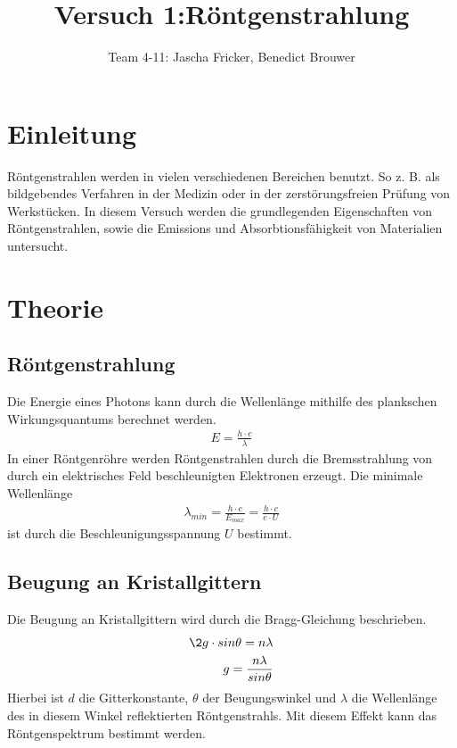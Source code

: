 \documentclass[11pt, a4paper]{article}
\title{Versuch 1:Röntgenstrahlung}
\author{Team 4-11: Jascha Fricker, Benedict Brouwer}
\begin{document}
    \maketitle

    \tableofcontents

    \newpage

    \section{Einleitung}

    Röntgenstrahlen werden in vielen verschiedenen Bereichen benutzt. So z. B. als bildgebendes Verfahren in der Medizin oder in der zerstörungsfreien Prüfung von Werkstücken. In diesem Versuch werden die grundlegenden Eigenschaften von Röntgenstrahlen, sowie die Emissions und Absorbtionsfähigkeit von Materialien untersucht.

    \section{Theorie}

    \subsection{Röntgenstrahlung}

    Die Energie eines Photons kann durch die Wellenlänge mithilfe des plankschen Wirkungsquantums berechnet werden.
    \begin{align}
        E = \frac{h \cdot c}{\lambda}
    \end{align}
    In einer Röntgenröhre werden Röntgenstrahlen durch die Bremsstrahlung von durch ein elektrisches Feld beschleunigten Elektronen erzeugt. Die minimale Wellenlänge
    \begin{align}
        \lambda_{min} = \frac{h \cdot c}{E_{max}} = \frac{h \cdot c}{e \cdot U}
    \end{align}
    ist durch die Beschleunigungsspannung $U$ bestimmt.

    \subsection{Beugung an Kristallgittern}

    Die Beugung an Kristallgittern wird durch die Bragg-Gleichung beschrieben.
    \begin{align}
        \2  g \cdot sin \theta = n \lambda \\%
        g = \frac{n \lambda}{sin \theta} \label{eq:gitter}
    \end{align}
    Hierbei ist $d$ die Gitterkonstante, $\theta$ der Beugungswinkel und $\lambda$ die Wellenlänge des in diesem Winkel reflektierten Röntgenstrahls. Mit diesem Effekt kann das Röntgenspektrum bestimmt werden.
\end{document}
